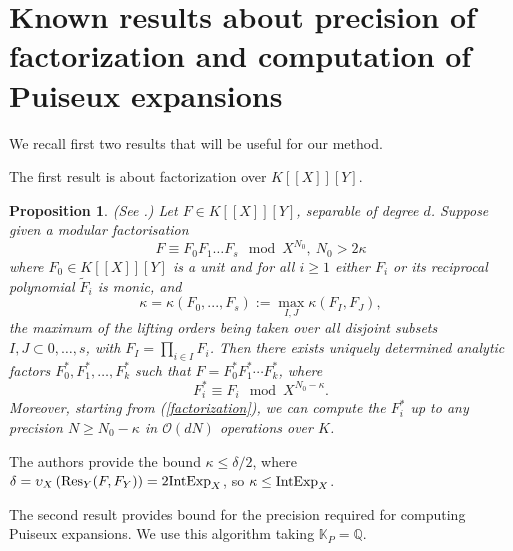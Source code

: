 \documentclass[a4paper,11pt,reqno]{amsart}%
\theoremstyle{definition}
\theoremstyle{plain}
\newtheorem{proposition}[definition]{Proposition}
\theoremstyle{remark}
\newcommand{\Q}{{\mathbb Q}}
\newcommand{\bigO}{\mathcal{O}}
\newcommand\ct[1]{\text{\rmfamily\upshape #1}}
\newcommand{\IntExpX}{\ct{IntExp}_X}
\begin{document}
\section{Known results about precision of factorization and computation of Puiseux expansions}

We recall first two results that will be useful for our method.

The first result is about factorization over $K[[X]][Y]$.

\begin{proposition}\label{prop:factors}(See \cite[Proposition 23]{poteaux2021}.)
Let $F \in K[[X]][Y]$, separable of degree $d$. Suppose given a modular factorisation
\begin{equation}\label{factorization}
F \equiv  F_0 F_1 \dots F_s \mod X^{N_0}, \ N_0 > 2\kappa
\end{equation}
where $F_0 \in K[[X]][Y]$ is a unit and for all $i \ge 1$ either $F_i$ or its reciprocal polynomial $\tilde F_i$ is monic, and
$$
\kappa = \kappa(F_0,..., F_s) := \max_{I, J} \kappa(F_I, F_J),
$$
the maximum of the lifting orders being taken over all disjoint subsets $I, J \subset {0,\dots,s}$,
with $F_I = \prod_{i\in I} F_i$. Then there exists uniquely determined analytic factors $F_0^*, F_1^*,\dots, F_k^*$ such that $F = F_0^* F_1^* \cdots F_k^*$, where
$$
F_i^* \equiv F_i \mod X^{N_0-\kappa}.
$$
Moreover, starting from (\ref{factorization}), we can compute the $F_i^*$ up to any precision $N \ge N_0 - \kappa$ in $\bigO(dN)$ operations over $K$.
\end{proposition}

The authors provide the bound $\kappa \le \delta / 2$, where $\delta = \upsilon_X \left( \operatorname{Res}_Y(F, F_Y) \right) = 2 \IntExpX$, so $\kappa \le \IntExpX$.

The second result provides bound for the precision required for computing Puiseux expansions.
We use this algorithm taking $\mathbb{K}_P = \Q$.
\end{document}
